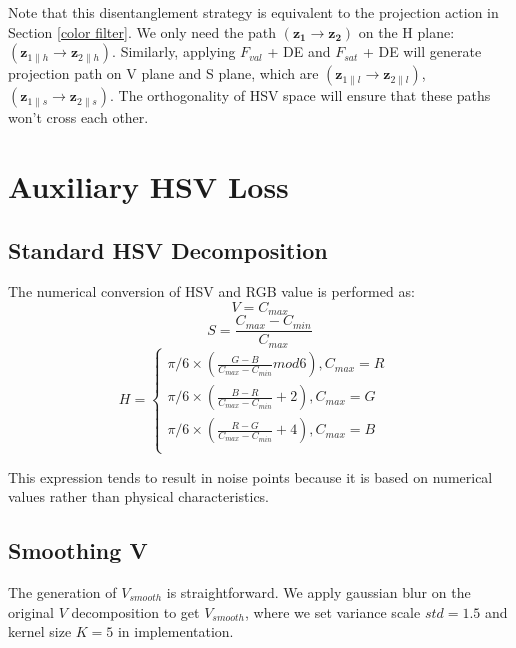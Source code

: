 \documentclass[runningheads]{llncs}
\begin{document}
   Note that this disentanglement strategy is equivalent to the projection action in Section \ref{color filter}.
   We only need the path $(\bm{z_1} \rightarrow \bm{z_2})$ on the H plane: $(\bm{z}_{1\parallel h} \rightarrow \bm{z}_{2\parallel h} )$.
   Similarly, applying $F_{val}$ + DE and $F_{sat}$ + DE will generate projection path on V plane and S plane, which are $(\bm{z}_{1\parallel l} \rightarrow \bm{z}_{2\parallel l} )$, $(\bm{z}_{1\parallel s} \rightarrow \bm{z}_{2\parallel s} )$. The orthogonality of HSV space will ensure that these paths won't cross each other.
   







\section{Auxiliary HSV Loss}
\label{sec:auxiliary-hsv-loss}

\subsection{Standard HSV Decomposition}
\label{standard hsl}
The numerical conversion of HSV and RGB value is performed as:
\begin{equation}
	V = C_{max}
\end{equation}
\begin{equation}\label{eq:naive_s}
	S = \frac{C_{max} - C_{min}}{C_{max}}
\end{equation}
\begin{equation}\label{eq:naive_h}
H=
\left\{
\begin{array}{lr}
\pi/6 \times(\frac{G-B}{C_{max}-C_{min}} mod6), C_{max}=R &  \\
\pi/6 \times(\frac{B-R}{C_{max}-C_{min}} +2), C_{max}=G &  \\
\pi/6 \times(\frac{R-G}{C_{max}-C_{min}} +4), C_{max}=B &  \\
\end{array}
\right.
\end{equation}

This expression tends to result in noise points because it is based on numerical values rather than physical characteristics.


\subsection{Smoothing V}

The generation of $V_{smooth}$ is straightforward.
We apply gaussian blur on the original $V$ decomposition to get $V_{smooth}$, where we set variance scale $std=1.5$ and kernel size $K=5$ in implementation.
\end{document}
